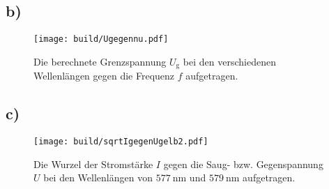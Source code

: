 \subsection{b)}
\begin{table}
	\centering
	\caption{???.}
  	
\end{table}
\begin{figure}
	\centering
	\caption{Die berechnete Grenzspannung $U_\text{g}$ bei den verschiedenen Wellenlängen gegen die Frequenz $f$ aufgetragen.}
	\texttt{[image: build/Ugegennu.pdf]}
	\label{fig:GraphUgegennu}
\end{figure}
 

\subsection{c)}
\begin{figure}
	\centering
	\caption{Die Wurzel der Stromstärke $I$ gegen die Saug- bzw. Gegenspannung $U$ bei den Wellenlängen von $\SI{577}{\nano\meter}$ und $ \SI{579}{\nano\meter}$ aufgetragen.}
	\texttt{[image: build/sqrtIgegenUgelb2.pdf]}
	\label{fig:Graphgelb2}
\end{figure}





 

 
